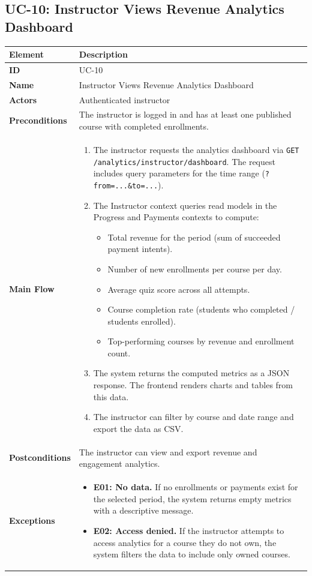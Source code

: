 \subsection{UC-10: Instructor Views Revenue Analytics Dashboard}

\begin{longtable}{p{3cm}p{10cm}}
  \toprule
  \textbf{Element} & \textbf{Description} \\
  \midrule
  \endhead
  \midrule
  \endfoot
  \textbf{ID} & UC-10 \\
  \textbf{Name} & Instructor Views Revenue Analytics Dashboard \\
  \textbf{Actors} & Authenticated instructor \\
  \textbf{Preconditions} & The instructor is logged in and has at least one published course with completed enrollments. \\
  \textbf{Main Flow} &
  \begin{enumerate}
    \item The instructor requests the analytics dashboard via \texttt{GET /analytics/instructor/dashboard}. The request includes query parameters for the time range (\texttt{?from=...\&to=...}).
    \item The Instructor context queries read models in the Progress and Payments contexts to compute:
      \begin{itemize}
        \item Total revenue for the period (sum of succeeded payment intents).
        \item Number of new enrollments per course per day.
        \item Average quiz score across all attempts.
        \item Course completion rate (students who completed / students enrolled).
        \item Top-performing courses by revenue and enrollment count.
      \end{itemize}
    \item The system returns the computed metrics as a JSON response. The frontend renders charts and tables from this data.
    \item The instructor can filter by course and date range and export the data as CSV.
  \end{enumerate} \\
  \textbf{Postconditions} & The instructor can view and export revenue and engagement analytics. \\
  \textbf{Exceptions} &
  \begin{itemize}
    \item \textbf{E01: No data.} If no enrollments or payments exist for the selected period, the system returns empty metrics with a descriptive message.
    \item \textbf{E02: Access denied.} If the instructor attempts to access analytics for a course they do not own, the system filters the data to include only owned courses.
  \end{itemize} \\
  \bottomrule
\end{longtable}
